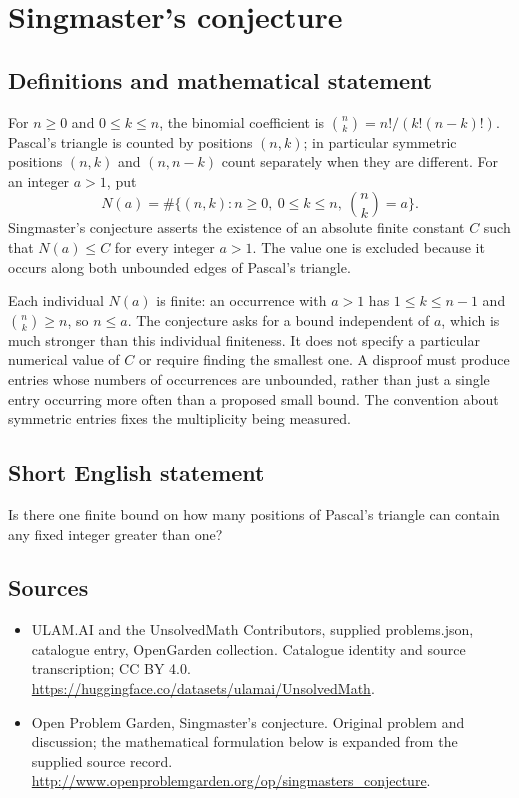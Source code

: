 \documentclass[11pt,a4paper]{article}
\begin{document}
\section*{Singmaster's conjecture}\label{statement}

\subsection{Definitions and mathematical statement}
For $n\ge0$ and $0\le k\le n$, the binomial coefficient is
$\binom nk=n!/(k!(n-k)!)$. Pascal's triangle is counted by positions
$(n,k)$; in particular symmetric positions $(n,k)$ and $(n,n-k)$
count separately when they are different. For an integer $a>1$, put
\[
 N(a)=\#\{(n,k):n\ge0,\ 0\le k\le n,\ \binom nk=a\}.
\]
Singmaster's conjecture asserts the existence of an absolute finite
constant $C$ such that $N(a)\le C$ for every integer $a>1$.
The value one is excluded because it occurs along both unbounded
edges of Pascal's triangle.

Each individual $N(a)$ is finite: an occurrence with $a>1$ has
$1\le k\le n-1$ and $\binom nk\ge n$, so $n\le a$.
The conjecture asks for a bound independent of $a$, which is much
stronger than this individual finiteness. It does not specify a
particular numerical value of $C$ or require finding the smallest
one. A disproof must produce entries whose numbers of occurrences
are unbounded, rather than just a single entry occurring more often
than a proposed small bound. The convention about symmetric entries
fixes the multiplicity being measured.
\subsection{Short English statement}
Is there one finite bound on how many positions of Pascal’s triangle can contain any fixed integer greater than one?
\subsection{Sources}
\begin{itemize}
\item[S1] ULAM.AI and the UnsolvedMath Contributors, supplied problems.json, catalogue entry, OpenGarden collection. Catalogue identity and source transcription; CC BY 4.0.
\url{https://huggingface.co/datasets/ulamai/UnsolvedMath}.
\item[S2] Open Problem Garden, Singmaster's conjecture. Original problem and discussion; the mathematical formulation below is expanded from the supplied source record.
\url{http://www.openproblemgarden.org/op/singmasters_conjecture}.
\end{itemize}
\end{document}

